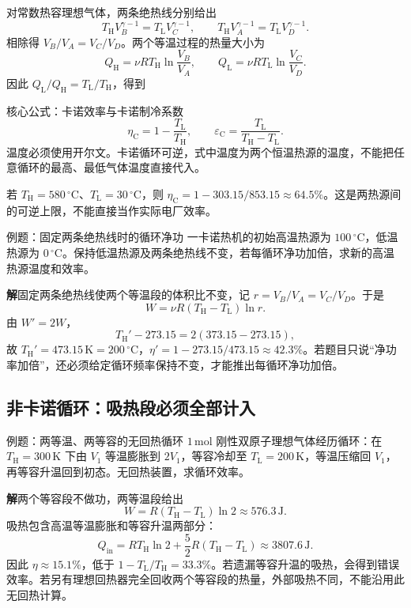\documentclass[UTF8,fontset=none,zihao=-4,a4paper]{ctexart}
\newcommand{\unit}[1]{\,\mathrm{#1}}
\newcommand{\sol}{\par\noindent\textbf{解}\quad}
\begin{document}
对常数热容理想气体，两条绝热线分别给出
\[
 T_{\mathrm H}V_B^{\gamma-1}=T_{\mathrm L}V_C^{\gamma-1},\qquad
 T_{\mathrm H}V_A^{\gamma-1}=T_{\mathrm L}V_D^{\gamma-1}.
\]
相除得 $V_B/V_A=V_C/V_D$。两个等温过程的热量大小为
\[
 Q_{\mathrm H}=\nu RT_{\mathrm H}\ln\frac{V_B}{V_A},\qquad
 Q_{\mathrm L}=\nu RT_{\mathrm L}\ln\frac{V_C}{V_D}.
\]
因此 $Q_{\mathrm L}/Q_{\mathrm H}=T_{\mathrm L}/T_{\mathrm H}$，得到
\begin{infobox}{核心公式：卡诺效率与卡诺制冷系数}
\[
 \eta_{\mathrm C}=1-\frac{T_{\mathrm L}}{T_{\mathrm H}},
 \qquad
 \varepsilon_{\mathrm C}=\frac{T_{\mathrm L}}{T_{\mathrm H}-T_{\mathrm L}}.
\]
温度必须使用开尔文。卡诺循环可逆，式中温度为两个恒温热源的温度，不能把任意循环的最高、最低气体温度直接代入。
\end{infobox}
若 $T_{\mathrm H}=580\,{}^\circ\mathrm C$、$T_{\mathrm L}=30\,{}^\circ\mathrm C$，则 $\eta_{\mathrm C}=1-303.15/853.15\approx64.5\%$。这是两热源间的可逆上限，不能直接当作实际电厂效率。

\begin{infobox}{例题：固定两条绝热线时的循环净功}
一卡诺热机的初始高温热源为 $100\,{}^\circ\mathrm C$，低温热源为 $0\,{}^\circ\mathrm C$。保持低温热源及两条绝热线不变，若每循环净功加倍，求新的高温热源温度和效率。
\end{infobox}
\sol 固定两条绝热线使两个等温段的体积比不变，记 $r=V_B/V_A=V_C/V_D$。于是
\[
 W=\nu R(T_{\mathrm H}-T_{\mathrm L})\ln r.
\]
由 $W'=2W$，
\[
 T_{\mathrm H}'-273.15=2(373.15-273.15),
\]
故 $T_{\mathrm H}'=473.15\unit K=200\,{}^\circ\mathrm C$，$\eta'=1-273.15/473.15\approx42.3\%$。若题目只说“净功率加倍”，还必须给定循环频率保持不变，才能推出每循环净功加倍。

\subsection{非卡诺循环：吸热段必须全部计入}
\begin{infobox}{例题：两等温、两等容的无回热循环}
$1\unit{mol}$ 刚性双原子理想气体经历循环：在 $T_{\mathrm H}=300\unit K$ 下由 $V_1$ 等温膨胀到 $2V_1$，等容冷却至 $T_{\mathrm L}=200\unit K$，等温压缩回 $V_1$，再等容升温回到初态。无回热装置，求循环效率。
\end{infobox}
\sol 两个等容段不做功，两等温段给出
\[
 W=R(T_{\mathrm H}-T_{\mathrm L})\ln2\approx576.3\unit J.
\]
吸热包含高温等温膨胀和等容升温两部分：
\[
 Q_{\mathrm{in}}=RT_{\mathrm H}\ln2+\frac52R(T_{\mathrm H}-T_{\mathrm L})
 \approx3807.6\unit J.
\]
因此 $\eta\approx15.1\%$，低于 $1-T_{\mathrm L}/T_{\mathrm H}=33.3\%$。若遗漏等容升温的吸热，会得到错误效率。若另有理想回热器完全回收两个等容段的热量，外部吸热不同，不能沿用此无回热计算。
\end{document}
